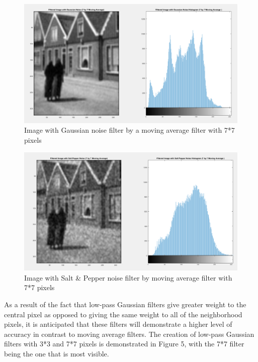 \begin{figure} [ht]
    \centering
    \includegraphics[width = \textwidth]{Resources/Image with Gaussian noise filter by a moving average filter.png}
    \caption{Image with Gaussian noise filter by a moving average filter with 7*7 pixels}
    \label{fig:Image with Gaussian noise filter by a moving average filter}
\end{figure}

\newpage

\begin{figure} [ht]
    \centering
    \includegraphics[width = \textwidth]{Resources/Image with Salt & Pepper noise filter by moving average filter.png}
    \caption{Image with Salt \& Pepper noise filter by moving average filter with 7*7 pixels}
    \label{fig:Image with salt and pepper noise filter by a moving average filter}
\end{figure}

As a result of the fact that low-pass Gaussian filters give greater weight to the central pixel as opposed to giving the same weight to all of the neighborhood pixels, it is anticipated that these filters will demonstrate a higher level of accuracy in contrast to moving average filters. The creation of low-pass Gaussian filters with 3*3 and 7*7 pixels is demonstrated in Figure 5, with the 7*7 filter being the one that is most visible.

